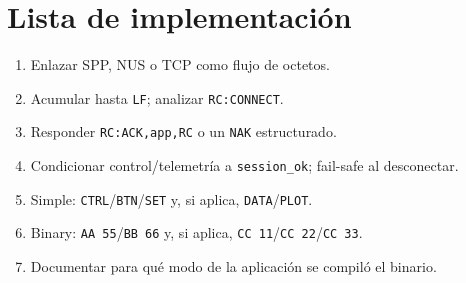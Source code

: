 \documentclass[12pt,a4paper]{article}
\begin{document}
\section{Lista de implementación}

\begin{enumerate}[leftmargin=1.6cm]
  \item Enlazar SPP, NUS o TCP como flujo de octetos.
  \item Acumular hasta \texttt{LF}; analizar \texttt{RC:CONNECT}.
  \item Responder \texttt{RC:ACK,app,RC} o un \texttt{NAK} estructurado.
  \item Condicionar control/telemetría a \texttt{session\_ok}; fail-safe
        al desconectar.
  \item Simple: \texttt{CTRL}/\texttt{BTN}/\texttt{SET} y, si aplica,
        \texttt{DATA}/\texttt{PLOT}.
  \item Binary: \texttt{AA 55}/\texttt{BB 66} y, si aplica,
        \texttt{CC 11}/\texttt{CC 22}/\texttt{CC 33}.
  \item Documentar para qué modo de la aplicación se compiló el binario.
\end{enumerate}
\end{document}
